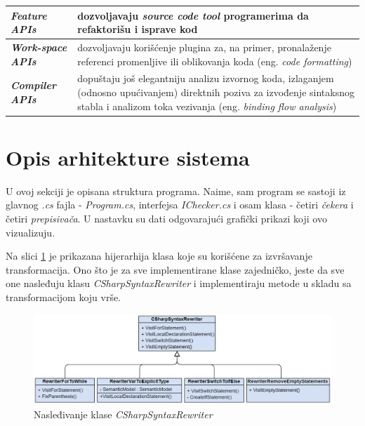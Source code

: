 \documentclass[a4paper]{article}
\begin{document}
{		\begin{center}
			\label{tab:tabela} %
			\begin{tabular}{ | m{3cm} | m{6cm} | } 
				\hline
				\textbf{\textit{Feature APIs}} & dozvoljavaju \textit{source code tool} programerima da refaktorišu i isprave kod  \\ 
				\hline
				\textbf{\textit{Work-space APIs}} & dozvoljavaju korišćenje plugina za, na primer, pronalaženje referenci promenljive ili oblikovanja koda (eng. \textit{code formatting})  \\ 
				\hline
				\textbf{\textit{Compiler APIs}} & dopuštaju još elegantniju analizu izvornog koda, izlaganjem (odnosno upućivanjem) direktnih poziva za izvođenje sintaksnog stabla i analizom toka vezivanja (eng. \textit{binding flow analysis})  \\ 
				\hline
			\end{tabular}
		\end{center}
		
		
		
		\section{Opis arhitekture sistema}
		\label{sec:opis_arhitekture_sistema}
		
		U ovoj sekciji je opisana struktura programa. Naime, sam program se sastoji iz glavnog \textit{.cs} fajla - \textit{Program.cs}, interfejsa \textit{IChecker.cs} i osam klasa - četiri \textit{čekera} i četiri \textit{prepisivača}. U nastavku su dati odgovarajući grafički prikazi koji ovo vizualizuju.
		
		
		Na slici \ref{fig:CSharpSyntaxRewriter} je prikazana hijerarhija klasa koje su korišćene za izvršavanje transformacija. Ono što je za sve implementirane klase zajedničko, jeste da sve one nasleđuju klasu \textit{CSharpSyntaxRewriter} i implementiraju metode u skladu sa transformacijom koju vrše.
		
		\begin{figure}[!htb]
			\begin{center}
				\includegraphics[scale=0.5]{images/CSharpSyntaxRewriter.png}
			\end{center}
			\caption{Nasleđivanje klase \textit{CSharpSyntaxRewriter}}
			\label{fig:CSharpSyntaxRewriter}
		\end{figure}
		
}
\end{document}
